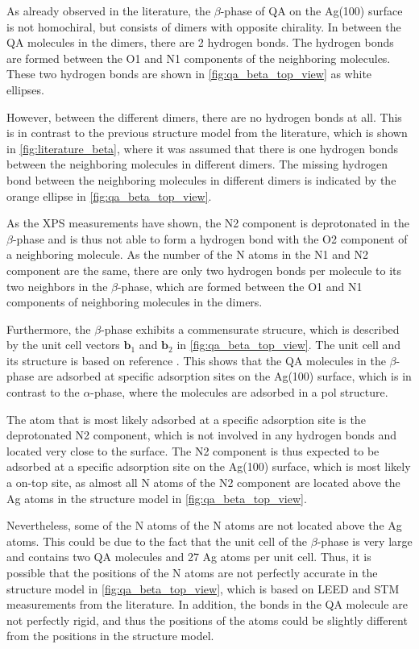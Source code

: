 As already observed in the literature\autocite{Humberg2020}, the $\beta$-phase of \ac{QA} on the Ag(100) surface is not homochiral, but consists of dimers with opposite chirality. In between the \ac{QA} molecules in the dimers, there are 2 hydrogen bonds. The hydrogen bonds are formed between the O1 and N1 components of the neighboring molecules. These two hydrogen bonds are shown in \autoref{fig:qa_beta_top_view} as white ellipses.

However, between the different dimers, there are no hydrogen bonds at all. This is in contrast to the previous structure model from the literature, which is shown in \autoref{fig:literature_beta}, where it was assumed that there is one hydrogen bonds between the neighboring molecules in different dimers. The missing hydrogen bond between the neighboring molecules in different dimers is indicated by the orange ellipse in \autoref{fig:qa_beta_top_view}.

As the \ac{XPS} measurements have shown, the N2 component is deprotonated in the $\beta$-phase and is thus not able to form a hydrogen bond with the O2 component of a neighboring molecule. As the number of the N atoms in the N1 and N2 component are the same, there are only two hydrogen bonds per molecule to its two neighbors in the $\beta$-phase, which are formed between the O1 and N1 components of neighboring molecules in the dimers.

Furthermore, the $\beta$-phase exhibits a commensurate strucure, which is described by the unit cell vectors $\mathbf{b}_1$ and $\mathbf{b}_2$ in \autoref{fig:qa_beta_top_view}. The unit cell and its structure is based on reference \cite{Humberg2020}. This shows that the \ac{QA} molecules in the $\beta$-phase are adsorbed at specific adsorption sites on the Ag(100) surface, which is in contrast to the $\alpha$-phase, where the molecules are adsorbed in a \ac{pol} structure. 

The atom that is most likely adsorbed at a specific adsorption site is the deprotonated N2 component, which is not involved in any hydrogen bonds and located very close to the surface. The N2 component is thus expected to be adsorbed at a specific adsorption site on the Ag(100) surface, which is most likely a on-top site, as almost all N atoms of the N2 component are located above the Ag atoms in the structure model in \autoref{fig:qa_beta_top_view}.

Nevertheless, some of the N atoms of the N atoms are not located above the Ag atoms. This could be due to the fact that the unit cell of the $\beta$-phase is very large and contains two \ac{QA} molecules and 27 Ag atoms per unit cell. Thus, it is possible that the positions of the N atoms are not perfectly accurate in the structure model in \autoref{fig:qa_beta_top_view}, which is based on \ac{LEED} and \ac{STM} measurements from the literature.\autocite{Humberg2020} In addition, the bonds in the \ac{QA} molecule are not perfectly rigid, and thus the positions of the atoms could be slightly different from the positions in the structure model.

